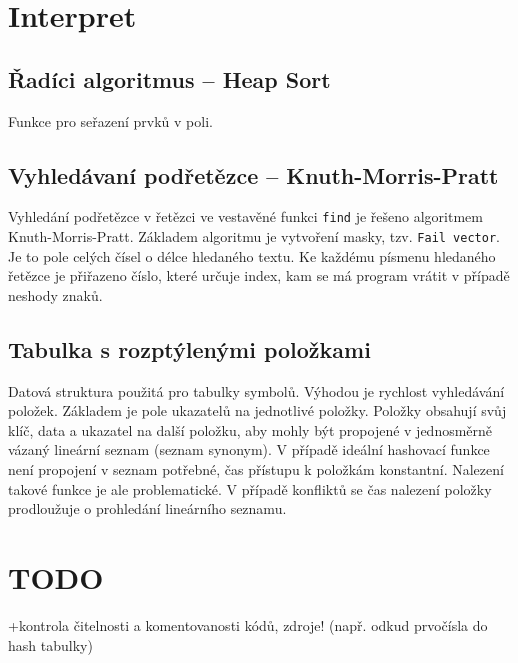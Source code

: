 \documentclass[a4paper, 12pt]{article}
\begin{document}
\section{Interpret} \label{interpret}

\subsection{Řadíci algoritmus -- Heap Sort}
Funkce pro seřazení prvků v poli.

\subsection{Vyhledávaní podřetězce -- Knuth-Morris-Pratt}
Vyhledání podřetězce v řetězci ve vestavěné funkci \texttt{find} je řešeno
algoritmem Knuth-Morris-Pratt. Základem algoritmu je vytvoření masky, tzv.
\texttt{Fail vector}. Je to pole celých čísel o délce hledaného textu. Ke
každému písmenu hledaného řetězce je přiřazeno číslo, které určuje index, kam
se má program vrátit v případě neshody znaků.

\subsection{Tabulka s rozptýlenými položkami}
Datová struktura použitá pro tabulky symbolů. Výhodou je rychlost vyhledávání
položek. Základem je pole ukazatelů na
jednotlivé položky. Položky obsahují svůj klíč, data a ukazatel na další
položku, aby mohly být propojené v jednosměrně vázaný lineární
seznam (seznam synonym). V případě ideální hashovací funkce není propojení v
seznam potřebné, čas přístupu k položkám konstantní. Nalezení takové
funkce je ale problematické. V případě konfliktů se čas nalezení položky
prodloužuje o prohledání lineárního seznamu.

\section{TODO} \label{todo}
+kontrola čitelnosti a komentovanosti kódů, zdroje! (např. odkud prvočísla do hash tabulky)
\end{document}
